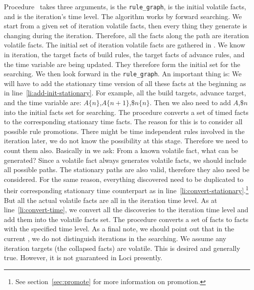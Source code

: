 \documentclass{article}
\begin{document}
Procedure~ takes three arguments, 
is the \texttt{rule\_graph},  is the initial volatile facts,
and  is the iteration's time level.
The algorithm works by forward searching. We start from a given set of
iteration volatile facts, then every thing they generate is changing
during the iteration. Therefore, all the facts along the path are
iteration volatile facts. The initial set of iteration volatile facts
are gathered in . We know in iteration, the target
facts of build rules, the target facts of advance rules, and the time
variable are being updated. They therefore form the initial set for
the searching. We then look forward in the \texttt{rule\_graph}. An
important thing is: We will have to add the stationary time version of
all these facts at the beginning as in
line~\ref{li:add-init-stationary}. For example, all the build targets,
advance target, and the time variable are:
$A\{n\}$,$A\{n+1\}$,$\$n\{n\}$. Then we also need to add $A$,$\$n$
into the initial facts set for searching. The procedure
 converts a set of timed facts to the
corresponding stationary time facts. The reason for this is to
consider all possible rule promotions. There might be time independent
rules involved in the iteration later, we do not know the possibility
at this stage. Therefore we need to count them
also. Basically in  we ask: From
a known volatile fact, what can be generated? Since a volatile fact
always generates volatile facts, we should include all
possible paths. The stationary paths are also valid, therefore they
also need be considered. For the same reason, everything discovered
need to be duplicated to their corresponding stationary time
counterpart as in line~\ref{li:convert-stationary}.\footnote{See
  section~\ref{sec:promote} for more information on promotion.}
But all the actual
volatile facts are all in the iteration time level. As at
line~\ref{li:convert-time}, we convert all the discoveries to the
iteration time level and add them into the volatile facts set. The
procedure  converts a set of facts to facts with
the specified time level. As a final note, we should point out that in
the current , we do not distinguish
iterations in the searching. We assume any iteration targets (the
collapsed facts) are volatile. This is desired and generally
true. However, it is not guaranteed in Loci presently.
\end{document}
